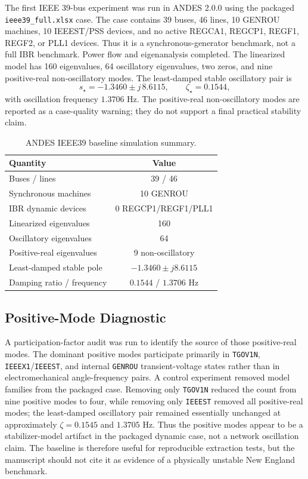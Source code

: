 \documentclass[journal]{IEEEtran}
\begin{document}
The first IEEE 39-bus experiment was run in ANDES 2.0.0 using the packaged \texttt{ieee39\_full.xlsx} case. The case contains 39 buses, 46 lines, 10 GENROU machines, 10 IEEEST/PSS devices, and no active REGCA1, REGCP1, REGF1, REGF2, or PLL1 devices. Thus it is a synchronous-generator benchmark, not a full IBR benchmark. Power flow and eigenanalysis completed. The linearized model has 160 eigenvalues, 64 oscillatory eigenvalues, two zeros, and nine positive-real non-oscillatory modes. The least-damped stable oscillatory pair is
\begin{equation}
s_\star=-1.3460\pm j\,8.6115,\qquad \zeta_\star=0.1544,
\end{equation}
with oscillation frequency $1.3706$ Hz. The positive-real non-oscillatory modes are reported as a case-quality warning; they do not support a final practical stability claim.

\begin{table}[t]
\centering
\caption{ANDES IEEE39 baseline simulation summary.}
\label{tab:andesbaseline}
\begin{tabular}{lc}
\toprule
Quantity & Value\\
\midrule
Buses / lines & 39 / 46\\
Synchronous machines & 10 GENROU\\
IBR dynamic devices & 0 REGCP1/REGF1/PLL1\\
Linearized eigenvalues & 160\\
Oscillatory eigenvalues & 64\\
Positive-real eigenvalues & 9 non-oscillatory\\
Least-damped stable pole & $-1.3460\pm j8.6115$\\
Damping ratio / frequency & $0.1544$ / $1.3706$ Hz\\
\bottomrule
\end{tabular}
\end{table}

\subsection{Positive-Mode Diagnostic}

A participation-factor audit was run to identify the source of those positive-real modes. The dominant positive modes participate primarily in \texttt{TGOV1N}, \texttt{IEEEX1}/\texttt{IEEEST}, and internal \texttt{GENROU} transient-voltage states rather than in electromechanical angle-frequency pairs. A control experiment removed model families from the packaged case. Removing only \texttt{TGOV1N} reduced the count from nine positive modes to four, while removing only \texttt{IEEEST} removed all positive-real modes; the least-damped oscillatory pair remained essentially unchanged at approximately $\zeta=0.1545$ and $1.3705$ Hz. Thus the positive modes appear to be a stabilizer-model artifact in the packaged dynamic case, not a network oscillation claim. The baseline is therefore useful for reproducible extraction tests, but the manuscript should not cite it as evidence of a physically unstable New England benchmark.
\end{document}
